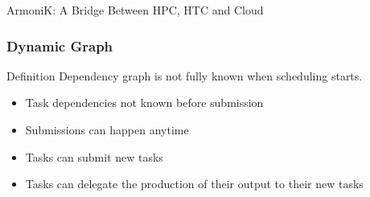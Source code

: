 \documentclass[10pt,aspectratio=1609]{beamer}
\begin{document}
\begin{section}{ArmoniK: A Bridge Between HPC, HTC and Cloud}
  \begin{frame}
    \frametitle{Dynamic Graph}
    \begin{block}{Definition}
      Dependency graph is not fully known when scheduling starts.
    \end{block}
    \begin{itemize}
      \item Task dependencies not known before submission
      \item Submissions can happen anytime
      \item Tasks can submit new tasks
      \item Tasks can delegate the production of their output to their new tasks
    \end{itemize}
    \footnotesize
    
  \end{frame}


\end{section}
\end{document}
